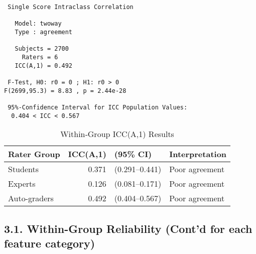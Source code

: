 \documentclass[
  11pt]{report}
\begin{document}
\begin{verbatim}
 Single Score Intraclass Correlation

   Model: twoway 
   Type : agreement 

   Subjects = 2700 
     Raters = 6 
   ICC(A,1) = 0.492

 F-Test, H0: r0 = 0 ; H1: r0 > 0 
F(2699,95.3) = 8.83 , p = 2.44e-28 

 95%-Confidence Interval for ICC Population Values:
  0.404 < ICC < 0.567
\end{verbatim}

\begin{table}
\caption*{
{\large Within‐Group ICC(A,1) Results}
} 
\fontsize{12.0pt}{14.4pt}\selectfont
\begin{tabular*}{\linewidth}{@{\extracolsep{\fill}}lrll}
\toprule
Rater Group & ICC(A,1) & (95\% CI) & Interpretation \\ 
\midrule\addlinespace[2.5pt]
Students & 0.371 & (0.291–0.441) & Poor agreement \\ 
Experts & 0.126 & (0.081–0.171) & Poor agreement \\ 
Auto-graders & 0.492 & (0.404–0.567) & Poor agreement \\ 
\bottomrule
\end{tabular*}
\end{table}

\subsection{3.1. Within-Group Reliability (Cont'd for each feature
category)}\label{within-group-reliability-contd-for-each-feature-category}
\end{document}
